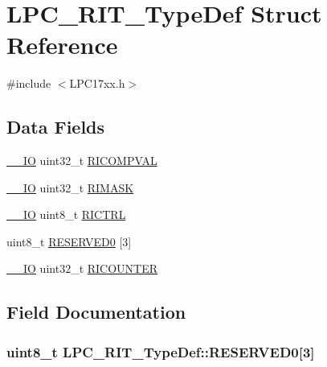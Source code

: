 \hypertarget{structLPC__RIT__TypeDef}{}\section{L\+P\+C\+\_\+\+R\+I\+T\+\_\+\+Type\+Def Struct Reference}
\label{structLPC__RIT__TypeDef}


{\ttfamily \#include $<$L\+P\+C17xx.\+h$>$}

\subsection*{Data Fields}
\begin{DoxyCompactItemize}
\item 
\hyperlink{LPC17xx_8h_aec43007d9998a0a0e01faede4133d6be}{\+\_\+\+\_\+\+IO} uint32\+\_\+t \hyperlink{structLPC__RIT__TypeDef_a61935034ac2503ec1803464a6007e931}{R\+I\+C\+O\+M\+P\+V\+AL}
\item 
\hyperlink{LPC17xx_8h_aec43007d9998a0a0e01faede4133d6be}{\+\_\+\+\_\+\+IO} uint32\+\_\+t \hyperlink{structLPC__RIT__TypeDef_aae32ee454d1d50e89f7c2b115f81c006}{R\+I\+M\+A\+SK}
\item 
\hyperlink{LPC17xx_8h_aec43007d9998a0a0e01faede4133d6be}{\+\_\+\+\_\+\+IO} uint8\+\_\+t \hyperlink{structLPC__RIT__TypeDef_a37145567c6963158ef90fb929b1b139c}{R\+I\+C\+T\+RL}
\item 
uint8\+\_\+t \hyperlink{structLPC__RIT__TypeDef_a98d0f22f7e719715ab2746fe626b636f}{R\+E\+S\+E\+R\+V\+E\+D0} \mbox{[}3\mbox{]}
\item 
\hyperlink{LPC17xx_8h_aec43007d9998a0a0e01faede4133d6be}{\+\_\+\+\_\+\+IO} uint32\+\_\+t \hyperlink{structLPC__RIT__TypeDef_a56336b32d9afb119f8071e80c1dd754f}{R\+I\+C\+O\+U\+N\+T\+ER}
\end{DoxyCompactItemize}


\subsection{Field Documentation}
\subsubsection[{\texorpdfstring{R\+E\+S\+E\+R\+V\+E\+D0}{RESERVED0}}]{\setlength{\rightskip}{0pt plus 5cm}uint8\+\_\+t L\+P\+C\+\_\+\+R\+I\+T\+\_\+\+Type\+Def\+::\+R\+E\+S\+E\+R\+V\+E\+D0\mbox{[}3\mbox{]}}\hypertarget{structLPC__RIT__TypeDef_a98d0f22f7e719715ab2746fe626b636f}{}\label{structLPC__RIT__TypeDef_a98d0f22f7e719715ab2746fe626b636f}
